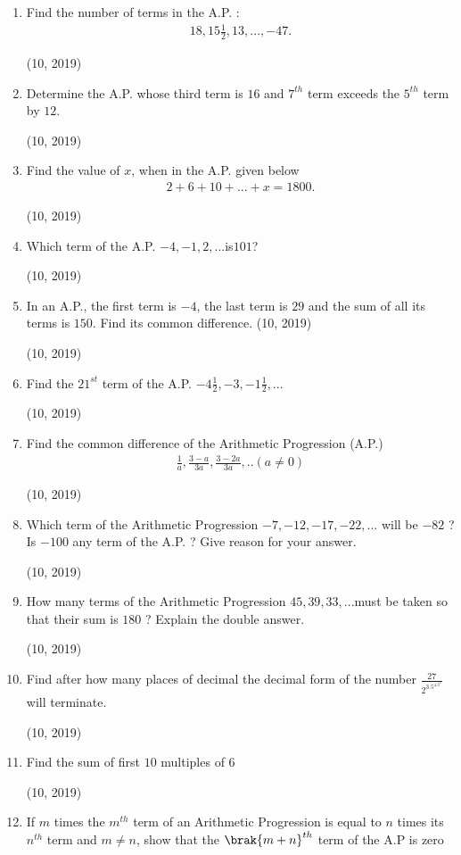 \begin{enumerate}[label=\thesubsection.\arabic*,ref=\thesubsection.\theenumi,itemsep=1pt]
 \item Find the number of terms in the A.P. :
\begin{align*}
    18,15\frac{1}{2},13, ...,-47.
\end{align*}

\hfill (10, 2019) \item Determine the A.P. whose third term is $16$ and $7^{th}$ term exceeds the $5^{th}$ term by $12$.

\hfill (10, 2019) \item Find the value of $x$, when in the A.P. given below
\begin{align*}
2 + 6 + 10 + ... + x = 1800.    
\end{align*}

\hfill (10, 2019) \item Which term of the A.P. $-4, - 1, 2, ... $is$ 101$?

\hfill (10, 2019) \item In an A.P., the first term is $- 4$, the last term is $29$ and the sum of all its terms is $150$. Find its common difference.
\hfill (10, 2019)

\hfill (10, 2019) \item Find the $21^{st}$ term of the A.P. $-4 \frac{1}{2},-3,-1\frac{1}{2},...$

\hfill (10, 2019) \item Find the common difference of the Arithmetic Progression (A.P.) 
\begin{align*}
\frac{1}{a} , \frac{3-a}{3a},\frac{3-2a}{3a} , . . (a \neq 0)
\end{align*}

\hfill (10, 2019) \item Which term of the Arithmetic Progression $-7, -12, -17, -22, ... $ will be $-82$ ? Is $-100$ any term of the A.P. ? Give reason for your answer.

\hfill (10, 2019) \item How many terms of the Arithmetic Progression $45, 39, 33, ... $must be taken so that their sum is $180$ ? Explain the double answer.

\hfill (10, 2019) \item Find after how many places of decimal the decimal form of the number $\frac {27}{2^3.5^4.3^2}$ will terminate.

\hfill (10, 2019) \item Find the sum of first $10$ multiples of $6$

\hfill (10, 2019) \item If $m$ times the $m^{th}$ term of an Arithmetic Progression is equal to $n$ times
its $n^{th}$ term and $m \neq n$, show that the $\brak{m + n}^{th}$ term of the A.P is zero


\end{enumerate}
